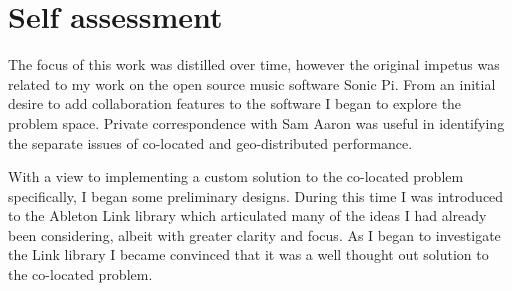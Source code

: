 \documentclass[11pt]{article} %
\theoremstyle{plain}
\theoremstyle{definition}
\begin{document}










\section{Self assessment}

The focus of this work was distilled over time, however the original impetus
was related to my work on the open source music software Sonic
Pi\cite{sonicpi}. From an initial desire to add collaboration features to the
software I began to explore the problem space. Private correspondence with Sam
Aaron was useful in identifying the separate issues of co-located and
geo-distributed performance.

With a view to implementing a custom solution to the co-located problem
specifically, I began some preliminary designs. During this time I was
introduced to the Ableton Link library which articulated many of the ideas I
had already been considering, albeit with greater clarity and focus. As I began
to investigate the Link library I became convinced that it was a well thought
out solution to the co-located problem.
\end{document}
